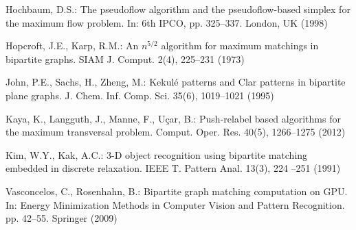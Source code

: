 \documentclass[11pt,a4paper]{article}
\begin{document}
\begin{thebibliography}{10}
Hochbaum, D.S.: The pseudoflow algorithm and the pseudoflow-based simplex for
  the maximum flow problem. In: 6th IPCO, pp. 325--337. London, UK (1998)

Hopcroft, J.E., Karp, R.M.: An $n^{5/2}$ algorithm for maximum matchings in
  bipartite graphs. SIAM J. Comput.  2(4),  225--231 (1973)

John, P.E., Sachs, H., Zheng, M.: Kekul\'e patterns and {C}lar patterns in
  bipartite plane graphs. J. Chem. Inf. Comp. Sci.  35(6),  1019--1021 (1995)

Kaya, K., Langguth, J., Manne, F., U\c{c}ar, B.: Push-relabel based algorithms
  for the maximum transversal problem. Comput. Oper. Res.  40(5),  1266--1275
  (2012)

Kim, W.Y., Kak, A.C.: {3-D} object recognition using bipartite matching
  embedded in discrete relaxation. IEEE T. Pattern Anal.  13(3),  224 --251
  (1991)

Vasconcelos, C., Rosenhahn, B.: Bipartite graph matching computation on {GPU}.
  In: Energy Minimization Methods in Computer Vision and Pattern Recognition.
  pp. 42--55. Springer (2009)

\end{thebibliography}
\end{document}

